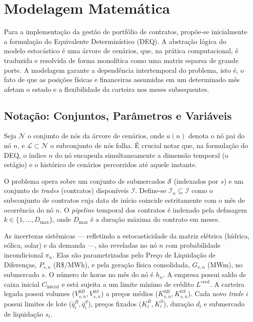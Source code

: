 
\section{Modelagem Matemática}
\label{sec:modelagem}

Para a implementação da gestão de portfólio de contratos, propõe-se inicialmente a formulação do Equivalente Determinístico (DEQ). A abstração lógica do modelo estocástico é uma árvore de cenários, que, na prática computacional, é traduzida e resolvida de forma monolítica como uma matriz esparsa de grande porte. A modelagem garante a dependência intertemporal do problema, isto é, o fato de que as posições físicas e financeiras assumidas em um determinado mês afetam o estado e a flexibilidade da carteira nos meses subsequentes.

\subsection{Notação: Conjuntos, Parâmetros e Variáveis}

Seja $\mathcal{N}$ o conjunto de nós da árvore de cenários, onde $a(n)$ denota o nó pai do nó $n$, e $\mathcal{L} \subset \mathcal{N}$ o subconjunto de nós folha. É crucial notar que, na formulação do DEQ, o índice $n$ do nó encapsula simultaneamente a dimensão temporal (o estágio) e o histórico de cenários percorridos até aquele instante. 

O problema opera sobre um conjunto de submercados $\mathcal{S}$ (indexados por $s$) e um conjunto de \textit{trades} (contratos) disponíveis $\mathcal{I}$. Define-se $\mathcal{I}_n \subseteq \mathcal{I}$ como o subconjunto de contratos cuja data de início coincide estritamente com o mês de ocorrência do nó $n$. O \textit{pipeline} temporal dos contratos é indexado pela defasagem $k \in \{1, \dots, D_{\max}\}$, onde $D_{\max}$ é a duração máxima do contrato em meses.

As incertezas sistêmicas — refletindo a estocasticidade da matriz elétrica (hídrica, eólica, solar) e da demanda —, são reveladas no nó $n$ com probabilidade incondicional $\pi_n$. Elas são parametrizadas pelo Preço de Liquidação de Diferenças, $P_{s,n}$ (R\$/MWh), e pela geração física consolidada, $G_{s,n}$ (MWm), no submercado $s$. O número de horas no mês do nó é $h_n$. A empresa possui saldo de caixa inicial $C_{\text{inicial}}$ e está sujeita a um limite mínimo de crédito $L^{\text{cred}}$. A carteira legada possui volumes ($V_{s,n}^{0B}, V_{s,n}^{0S}$) a preços médios ($K_{s,n}^{0B}, K_{s,n}^{0S}$). Cada novo \textit{trade} $i$ possui limites de lote ($\bar{q}_i^B, \bar{q}_i^S$), preços fixados ($K_i^B, K_i^S$), duração $d_i$ e submercado de liquidação $s_i$.

